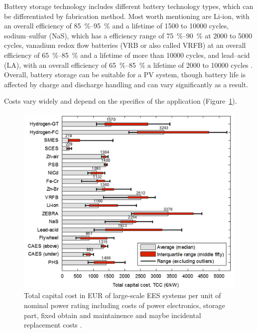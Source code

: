 Battery storage technology includes different battery technology types, which can be differentiated by fabrication method. Most worth mentioning are \ac{Li-ion}, with an overall efficiency of \SIrange{85}{95}{\percent} and a lifetime of \num{1500} to \num{10000} cycles, sodium–sulfur (NaS), which has a efficiency range of \SIrange{75}{90}{\percent} at \num{2000} to \num{5000} cycles, vanadium redox flow batteries (VRB or also called VRFB) at an overall efficiency of \SIrange{65}{85}{\percent} and a lifetime of more than \num{10000} cycles, and lead–acid (LA), with an overall efficiency of \SIrange{65}{85}{\percent} a lifetime of \num{2000} to \num{10000} cycles \cite{IEA2014c,Zakeri2015}. Overall, battery storage can be suitable for a \ac{PV} system, though battery life is affected by charge and discharge handling and can vary significantly as a result.



Costs vary widely and depend on the specifics of the application (Figure~\ref{TCC_EES}).


\begin{figure}[htbp]  
\centering
\includegraphics[width=0.65\linewidth]{FIG/TCC_EES}
\caption[Total capital cost in EUR of large-scale EES systems per unit of nominal power rating including costs of power electronics, storage part, fixed obtain and maintainence and maybe incidental replacement costs.]{Total capital cost in EUR of large-scale EES systems per unit of nominal power rating including costs of power electronics, storage part, fixed obtain and maintainence and maybe incidental replacement costs \cite{Zakeri2015}.}\label{TCC_EES}
\end{figure}
\pagebreak
